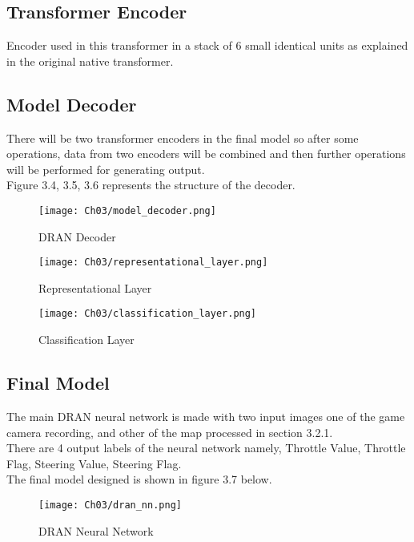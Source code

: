 \subsection{Transformer Encoder}
Encoder used in this transformer in a stack of 6 small identical units as explained in the original native transformer.

\subsection{Model Decoder}
There will be two transformer encoders in the final model so after some operations, data from two encoders will be combined and then further operations will be performed for generating output.
\\
Figure 3.4, 3.5, 3.6 represents the structure of the decoder.
\begin{figure}[h]
    \centering
    \texttt{[image: Ch03/model\_decoder.png]}
    \caption{DRAN Decoder}
    \label{figure:4}
\end{figure}
\begin{figure}[h]
    \centering
    \texttt{[image: Ch03/representational\_layer.png]}
    \caption{Representational Layer}
    \label{figure:5}
\end{figure}
\begin{figure}[h]
    \centering
    \texttt{[image: Ch03/classification\_layer.png]}
    \caption{Classification Layer}
    \label{figure:6}
\end{figure}
\FloatBarrier

\subsection{Final Model}
The main DRAN neural network is made with two input images one of the game camera recording, and other of the map processed in section 3.2.1.
\\
There are 4 output labels of the neural network namely, Throttle Value, Throttle Flag, Steering Value, Steering Flag.
\\
The final model designed is shown in figure 3.7 below.
\begin{figure}[h]
    \centering
    \texttt{[image: Ch03/dran\_nn.png]}
    \caption{DRAN Neural Network}
    \label{figure:7}
\end{figure}